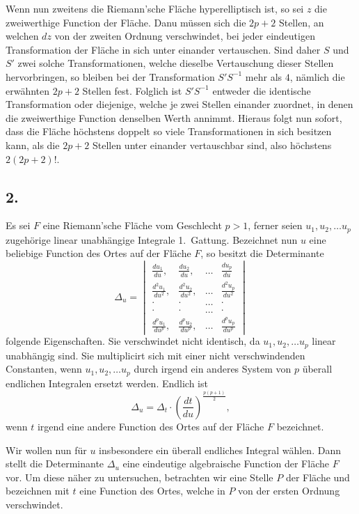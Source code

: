 \documentclass{article}
\begin{document}
Wenn nun zweitens die Riemann'sche Fläche hyperelliptisch ist, so sei $z$ die zweiwerthige Function der Fläche. Danu müssen sich die $2p+2$ Stellen, an welchen $dz$ von der zweiten Ordnung verschwindet, bei jeder eindeutigen Transformation der Fläche in sich unter einander vertauschen. Sind daher $S$ und $S'$ zwei solche Transformationen, welche dieselbe Vertauschung dieser Stellen hervorbringen, so bleiben bei der Transformation $S'S^{-1}$ mehr als $4$, nämlich die erwähnten $2p+2$ Stellen fest. Folglich ist $S'S^{-1}$ entweder die identische Transformation oder diejenige, welche je zwei Stellen einander zuordnet, in denen die zweiwerthige Function denselben Werth annimmt. Hieraus folgt nun sofort, dass die Fläche höchstens doppelt so viele Transformationen in sich besitzen kann, als die $2p+2$ Stellen unter einander vertauschbar sind, also höchstens $2(2p+2)!$.

\subsection*{2.}

Es sei $F$ eine Riemann'sche Fläche vom Geschlecht $p > 1$, ferner seien $u_1, u_2, \dots u_p$ zugehörige linear unabhängige Integrale 1.~Gattung. Bezeichnet nun $u$ eine beliebige Function des Ortes auf der Fläche $F$, so besitzt die Determinante
\[
\Delta_u =
\begin{vmatrix}
\frac{du_1}{du}, & \frac{du_2}{du}, & \dots & \frac{du_p}{du} \\
\frac{d^2u_1}{du^2}, & \frac{d^2u_2}{du^2}, & \dots & \frac{d^2u_p}{du^2} \\
\cdot & \cdot & \dots & \cdot \\
\cdot & \cdot & \dots & \cdot \\
\frac{d^p u_1}{du^p}, & \frac{d^p u_2}{du^p}, & \dots & \frac{d^p u_p}{du^p}
\end{vmatrix}
\tag{1}
\]
folgende Eigenschaften. Sie verschwindet nicht identisch, da $u_1, u_2, \dots u_p$ linear unabhängig sind. Sie multiplicirt sich mit einer nicht verschwindenden Constanten, wenn $u_1, u_2, \dots u_p$ durch irgend ein anderes System von $p$ überall endlichen Integralen ersetzt werden. Endlich ist
\[
\Delta_u = \Delta_t \cdot \left(\frac{dt}{du}\right)^{\frac{p(p+1)}{2}},
\tag{2}
\]
wenn $t$ irgend eine andere Function des Ortes auf der Fläche $F$ bezeichnet.

Wir wollen nun für $u$ insbesondere ein überall endliches Integral wählen. Dann stellt die Determinante $\Delta_u$ eine eindeutige algebraische Function der Fläche $F$ vor. Um diese näher zu untersuchen, betrachten wir eine Stelle $P$ der Fläche und bezeichnen mit $t$ eine Function des Ortes, welche in $P$ von der ersten Ordnung verschwindet.
\end{document}
